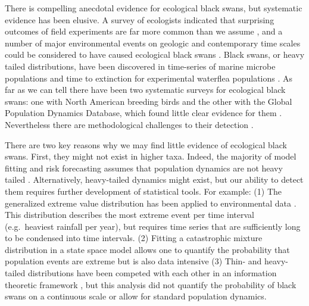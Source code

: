 There is compelling anecdotal evidence for ecological black swans, but
systematic evidence has been elusive. A survey of ecologists indicated that
surprising outcomes of field experiments are far more common than we assume
\citep{doak2008}, and a number of major environmental events on geologic and
contemporary time scales could be considered to have caused ecological black
swans \citep{nunez2012}.
Black swans, or heavy tailed distributions, have been discovered in time-series
of marine microbe populations \citet{segura2013} and time to extinction for
experimental waterflea populations \citet{drake2014}. As far as we can tell
there have been two systematic surveys for ecological black swans: one with North
American breeding birds and the other with the Global Population Dynamics Database, which 
 found little clear evidence for them \citep{keitt1998,allen2001,halley2002}.
Nevertheless there are methodological challenges to their detection
\citep{allen2001,ward2007}.

There are two key reasons why we may find little evidence of ecological black
swans. First, they might not exist in higher taxa. Indeed, the majority of
model fitting and risk forecasting assumes that population dynamics are not
heavy tailed \citep[e.g.][]{brook2006a,dennis2006,knape2012}. Alternatively,
heavy-tailed dynamics might exist, but our ability to detect them requires
further development of statistical tools. For example: (1) The generalized
extreme value distribution has been applied to environmental data
\citep[e.g.][]{katz2005}. This distribution describes the most extreme event
per time interval (e.g.~heaviest rainfall per year), but requires time series
that are sufficiently long to be condensed into time intervals. (2) Fitting
a catastrophic mixture distribution in a state space model allows one to
quantify the probability that population events are extreme but is also data
intensive \citep{ward2007} (3) Thin- and heavy-tailed distributions have been
competed with each other in an information theoretic framework
\citep{halley2002}, but this analysis did not quantify the probability of black
swans on a continuous scale or allow for standard population dynamics.


